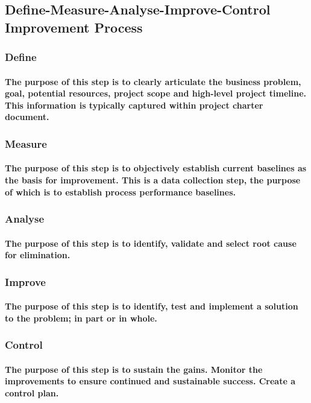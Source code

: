 \subsection{Define-Measure-Analyse-Improve-Control Improvement Process}
\subsubsection{Define}
\paragraph{The purpose of this step is to clearly articulate the business problem, goal, potential resources, project scope and high-level project timeline. This information is typically captured within project charter document.}
\subsubsection{Measure}
\paragraph{The purpose of this step is to objectively establish current baselines as the basis for improvement. This is a data collection step, the purpose of which is to establish process performance baselines.}
\subsubsection{Analyse}
\paragraph{The purpose of this step is to identify, validate and select root cause for elimination.}
\subsubsection{Improve}
\paragraph{The purpose of this step is to identify, test and implement a solution to the problem; in part or in whole.}
\subsubsection{Control}
\paragraph{The purpose of this step is to sustain the gains. Monitor the improvements to ensure continued and sustainable success. Create a control plan.}
